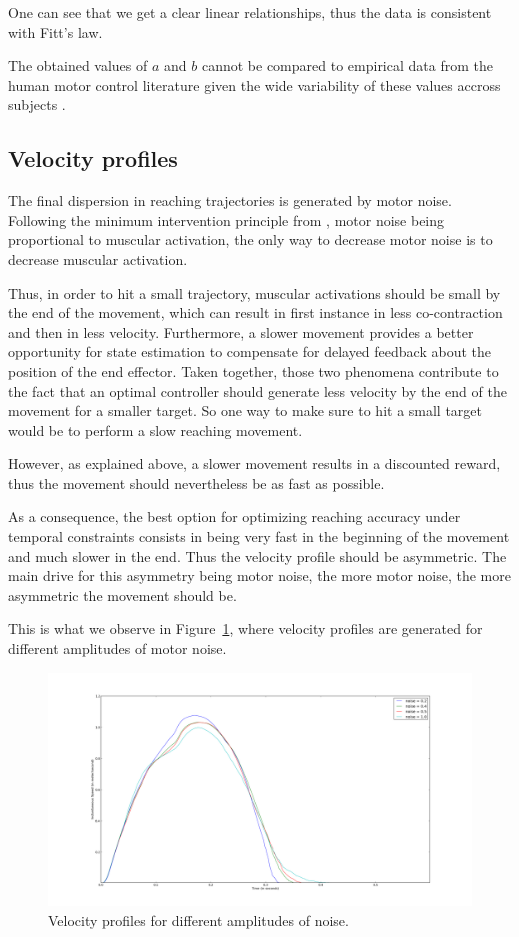 \documentclass[10pt]{article}
\begin{document}
One can see that we get a clear linear relationships, thus the data is consistent with Fitt's law.

The obtained values of $a$ and $b$ cannot be compared to empirical data from the human motor control literature given the wide variability of these values accross subjects \cite{crossman1983,mackenzie1989}.

\subsection{Velocity profiles}
\label{sec:velo_prof}

The final dispersion in reaching trajectories is generated by motor noise.
Following the minimum intervention principle from \cite{todorov02_NN}, motor noise being proportional to muscular activation, the only way to decrease motor noise is to decrease muscular activation.

Thus, in order to hit a small trajectory, muscular activations should be small
by the end of the movement, which can result in first instance in less co-contraction and then in less velocity. Furthermore, a slower movement provides a better opportunity for state estimation to compensate for delayed feedback about the position of the end effector. Taken together, those two phenomena contribute to the fact that an optimal controller should generate less velocity by the end of the movement for a smaller target.
So one way to make sure to hit a small target would be to perform a slow reaching movement.

However, as explained above, a slower movement results in a discounted reward,
thus the movement should nevertheless be as fast as possible.

As a consequence, the best option for optimizing reaching accuracy under
temporal constraints consists in being very fast in the beginning of the movement
and much slower in the end. Thus the velocity profile should be asymmetric. The main drive
for this asymmetry being motor noise, the more motor noise, the more asymmetric the movement should be.

This is what we observe in Figure~\ref{fig:velocity}, where velocity profiles are generated
for different amplitudes of motor noise.

\begin{figure}[htp]
  \centering
\includegraphics[width=.7\columnwidth]{images/speed_for_diff_noise}
  \caption{Velocity profiles for different amplitudes of noise\label{fig:velocity}.}
\end{figure}
\end{document}

